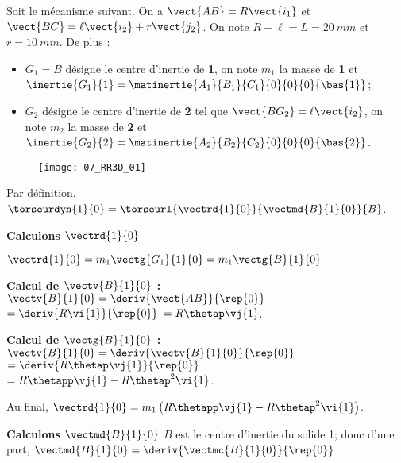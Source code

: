 \normalfalse \difficiletrue \tdifficilefalse
\correctiontrue


\setcounter{question}{0}%
\ifcorrection
\else
{}
\fi

\ifprof
\else
Soit le mécanisme suivant. On a $\vect{AB}=R\vect{i_1}$ et $\vect{BC}=\ell\vect{i_2}+r\vect{j_2}$. On note $R+\ell=L = \SI{20}{mm}$ et $r=\SI{10}{mm}$. De plus :
\begin{itemize}
\item $G_1=B$ désigne le centre d'inertie de \textbf{1}, on note $m_1$ la masse de \textbf{1} et $\inertie{G_1}{1}=\matinertie{A_1}{B_1}{C_1}{0}{0}{0}{\bas{1}}$; 
\item $G_2$ désigne le centre d'inertie de \textbf{2} tel que  $\vect{BG_2}=\ell\vect{i_2}$, on note $m_2$ la masse de \textbf{2} et $\inertie{G_2}{2}=\matinertie{A_2}{B_2}{C_2}{0}{0}{0}{\bas{2}}$.
\end{itemize}
\begin{figure}[H]
\texttt{[image: 07\_RR3D\_01]}
\end{figure}
\fi

\ifprof

Par définition, $\torseurdyn{1}{0} = \torseurl{\vectrd{1}{0}}{\vectmd{B}{1}{0}}{B}$.

\textbf{Calculons $\vectrd{1}{0}$}

$\vectrd{1}{0} = m_1\vectg{G_1}{1}{0}=m_1 \vectg{B}{1}{0} $

 \textbf{Calcul de $\vectv{B}{1}{0}$ : }  
$\vectv{B}{1}{0}=\deriv{\vect{AB}}{\rep{0}}$ 
$=\deriv{ R\vi{1}}{\rep{0}}$  
$= R\thetap \vj{1}$.


 \textbf{Calcul de $\vectg{B}{1}{0}$ : }  
$\vectv{B}{1}{0}=\deriv{\vectv{B}{1}{0}}{\rep{0}}$ 
$=\deriv{ R\thetap \vj{1}}{\rep{0}}$  
$=  R\thetapp \vj{1}-R\thetap^2 \vi{1}$.

Au final, $\vectrd{1}{0}= m_1\left(R\thetapp \vj{1}-R\thetap^2 \vi{1}\right)$.
\vspace{.5cm}

\textbf{Calculons $\vectmd{B}{1}{0}$}
$B$ est le centre d'inertie du solide 1; donc 
 d'une part, $\vectmd{B}{1}{0} = \deriv{\vectmc{B}{1}{0} }{\rep{0}}$.
 
